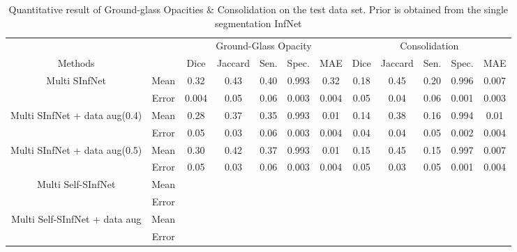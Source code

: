 \begin{table}
	\centering
	\begin{tabular}{| c | c || c c c c c || c c c c c |}
		\hline
		& &\multicolumn{5}{c||}{Ground-Glass Opacity} & \multicolumn{5}{c|}{Consolidation}\\ \cline{3-12}
		Methods & & Dice & Jaccard & Sen. & Spec. & MAE & Dice & Jaccard & Sen. & Spec. & MAE \\\hline
		Multi SInfNet & Mean & 0.32 & 0.43 & 0.40 & 0.993 & 0.32 & 0.18 & 0.45  & 0.20 & 0.996 & 0.007  \\ \cline{2-12}
		& Error & 0.004 & 0.05 & 0.06 & 0.003 & 0.004 & 0.05 & 0.04 & 0.06 & 0.001 & 0.003 \\ \hline \hline
		
		Multi SInfNet + data aug(0.4) & Mean & 0.28 & 0.37 & 0.35 & 0.993 & 0.01 & 0.14 & 0.38 & 0.16 & 0.994 & 0.01  \\ \cline{2-12}
		& Error & 0.05 & 0.03 & 0.06 & 0.003 & 0.004 & 0.04 & 0.04 & 0.05 & 0.002 & 0.004  \\ \hline \hline
		
		Multi SInfNet + data aug(0.5) & Mean & 0.30 & 0.42 & 0.37 & 0.993 & 0.01 & 0.15 & 0.45 & 0.15 & 0.997 & 0.007  \\ \cline{2-12}
		& Error & 0.05 & 0.03 & 0.06 & 0.003 & 0.004 & 0.05 & 0.03 & 0.05 & 0.001 & 0.004  \\ \hline \hline
		
		Multi Self-SInfNet & Mean & & & & & & & & & &  \\ \cline{2-12}
		& Error & & & & & & & & & &  \\ \hline \hline
		
		Multi Self-SInfNet + data aug & Mean & & & & & & & & & &  \\ \cline{2-12}
		& Error & & & & & & & & & &  \\ \hline \hline
	\end{tabular}
	\caption{Quantitative result of Ground-glass Opacities \& Consolidation on the test data set. Prior is obtained from the single segmentation InfNet}
\end{table}


